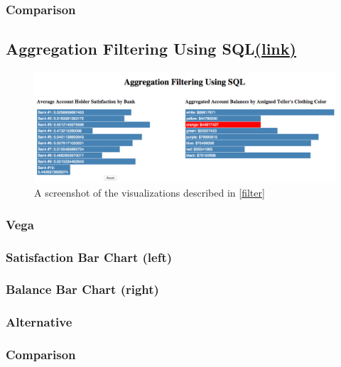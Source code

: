 \documentclass[fleqn]{sigplanconf}
\begin{document}
\subsubsection{Comparison}
\subsection{Aggregation Filtering Using SQL\href{http://randy.cs.columbia.edu/lineage/pgbench-filter/pgbench.html}{(\underline{link})}}\label{filter}
\begin{figure}[H]
	\includegraphics[width=\columnwidth]{figures/filter}
	\caption{A screenshot of the visualizations described in \autoref{filter}
	}
	\label{fig_filter}
\end{figure}
\subsubsection{Vega}
\subsubsection*{Satisfaction Bar Chart (left)}

\subsubsection*{Balance Bar Chart (right)}

\subsubsection{Alternative}
\subsubsection{Comparison}



\end{document}
